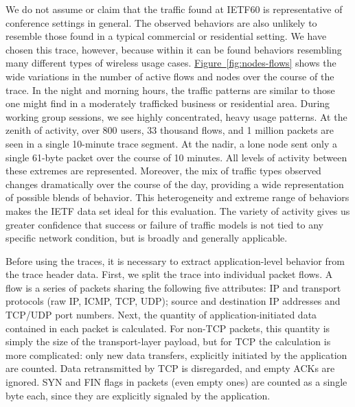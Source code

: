 \documentclass[twocolumn,final]{svjour3}
\newcommand{\caps}[1]{{\small{#1}}}
\newcommand{\Figure}[1]{\hyperref[fig:#1]{Figure~\ref*{fig:#1}}}
\begin{document}
We do not assume or claim that the traffic found at \caps{IETF}60 is representative of conference settings in general. The observed behaviors are also unlikely to resemble those found in a typical commercial or residential setting. We have chosen this trace, however, because within it can be found behaviors resembling many different types of wireless usage cases. \Figure{nodes-flows} shows the wide variations in the number of active flows and nodes over the course of the trace. In the night and morning hours, the traffic patterns are similar to those one might find in a moderately trafficked business or residential area. During working group sessions, we see highly concentrated, heavy usage patterns. At the zenith of activity, over 800 users, 33 thousand flows, and 1 million packets are seen in a single 10-minute trace segment. At the nadir, a lone node sent only a single 61-byte packet over the course of 10 minutes. All levels of activity between these extremes are represented. Moreover, the mix of traffic types observed changes dramatically over the course of the day, providing a wide representation of possible blends of behavior. This heterogeneity and extreme range of behaviors makes the \caps{IETF} data set ideal for this evaluation. The variety of activity gives us greater confidence that success or failure of traffic models is not tied to any specific network condition, but is broadly and generally applicable. %

Before using the traces, it is necessary to extract application-level behavior from the trace header data. First, we split the trace into individual packet flows. A flow is a series of packets sharing the following five attributes: \caps{IP} and transport protocols (raw \caps{IP}, \caps{ICMP}, \caps{TCP}, \caps{UDP}); source and destination \caps{IP} addresses and \caps{TCP}/\caps{UDP} port numbers. Next, the quantity of application-initiated data contained in each packet is calculated. For non-\caps{TCP} packets, this quantity is simply the size of the transport-layer payload, but for \caps{TCP} the calculation is more complicated: only new data transfers, explicitly initiated by the application are counted. Data retransmitted by \caps{TCP} is disregarded, and empty \caps{ACK}s are ignored. \caps{SYN} and \caps{FIN} flags in packets (even empty ones) are counted as a single byte each, since they are explicitly signaled by the application. %
\end{document}
